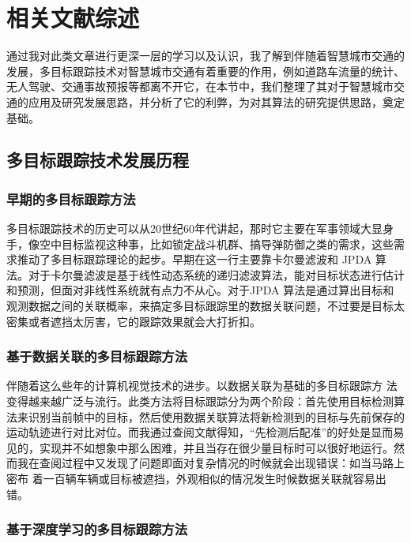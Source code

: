\chapter{相关文献综述}

通过我对此类文章进行更深一层的学习以及认识，我了解到伴随着智慧城市交通的发展，多目标跟踪技术对智慧城市交通有着重要的作用，例如道路车流量的统计、无人驾驶、交通事故预报等都离不开它，在本节中，我们整理了其对于智慧城市交通的应用及研究发展思路，并分析了它的利弊，为对其算法的研究提供思路，奠定基础。


\section{多目标跟踪技术发展历程}

\subsection{早期的多目标跟踪方法}

多目标跟踪技术的历史可以从20世纪60年代讲起，那时它主要在军事领域大显身手，像空中目标监视这种事，比如锁定战斗机群、搞导弹防御之类的需求，这些需求推动了多目标跟踪理论的起步。早期在这一行主要靠卡尔曼滤波和 JPDA 算法\cite{barshalom2012tracking}。对于卡尔曼滤波是基于线性动态系统的递归滤波算法，能对目标状态进行估计和预测，但面对非线性系统就有点力不从心。对于JPDA 算法是通过算出目标和观测数据之间的关联概率，来搞定多目标跟踪里的数据关联问题，不过要是目标太密集或者遮挡太厉害，它的跟踪效果就会大打折扣。




\subsection{基于数据关联的多目标跟踪方法}


伴随着这么些年的计算机视觉技术的进步。以数据关联为基础的多目标跟踪方 法变得越来越广泛与流行。此类方法将目标跟踪分为两个阶段：首先使用目标检测算法来识别当前帧中的目标，然后使用数据关联算法将新检测到的目标与先前保存的运动轨迹进行对比对位。而我通过查阅文献\cite{wang2020research}得知，“先检测后配准”的好处是显而易见的，实现并不如想象中那么困难，并且当存在很少量目标时可以很好地运行。然而我在查阅过程中又发现了问题即面对复杂情况的时候就会出现错误：如当马路上密布 着一百辆车辆或目标被遮挡，外观相似的情况发生时候数据关联就容易出错。




\subsection{基于深度学习的多目标跟踪方法}

